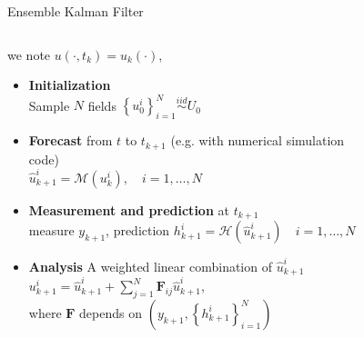 \documentclass[aspectratio=169]{beamer} %
\begin{document}
\begin{frame}{Ensemble Kalman Filter}
    \begin{columns}
        \begin{column}{0.6\textwidth}
            \small
            we note $u(\cdot, t_{k}) = u_k(\cdot)$,
            \begin{itemize}
                \item<1-> \textbf{Initialization} \\
                    Sample $N$ fields $\left\{u^i_0\right\}_{i=1}^N \stackrel{iid}{\sim} U_0$
                    \vfill
                \item<2-> \textbf{Forecast} from $t$ to $t_{k+1}$ (e.g. with numerical simulation code) \\
                    $\hat u^i_{k+1} = \mathcal M(u_k^i), \quad i = 1, \dots, N$
                    \vfill
                \item<3-> \textbf{Measurement and prediction} at $t_{k+1}$\\
                    measure $y_{k+1}$, prediction $h^i_{k+1} = \mathcal H (\hat u^i_{k+1}) \quad i = 1, \dots, N$
                    \vfill
                \item<4-> \textbf{Analysis} A weighted linear combination of $\hat u_{k+1}^i$ \\
                    $u^i_{k+1} = \hat u^i_{k+1} + \sum_{j=1}^N \bm F_{ij} \hat u^i_{k+1}$, \\ where $\bm F$ depends on $\left(y_{k+1}, \left\{h^i_{k+1}\right\}_{i=1}^N\right)$\footnotemark[1]
            \end{itemize}
        \end{column}
        \begin{column}{0.4\textwidth}
            \begin{figure}
                \centering

\end{figure}
\end{column}
\end{columns}
\end{frame}
\end{document}
